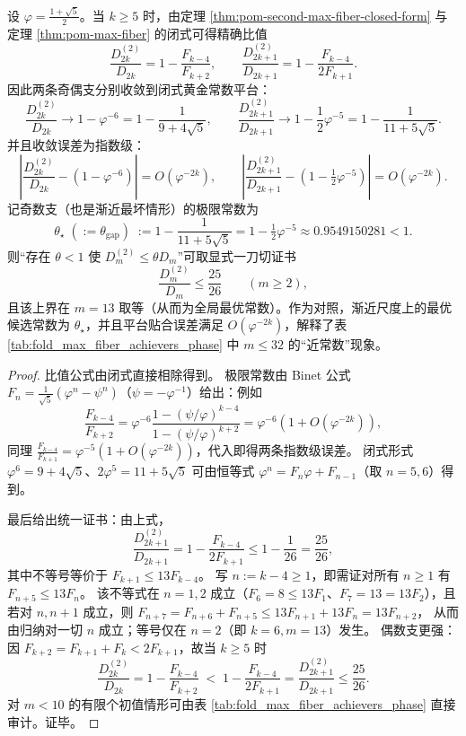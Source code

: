 \begin{corollary}\label{cor:pom-second-max-gap-constant}
设 \(\varphi=\frac{1+\sqrt5}{2}\)。当 \(k\ge 5\) 时，由定理 \ref{thm:pom-second-max-fiber-closed-form} 与定理 \ref{thm:pom-max-fiber} 的闭式可得精确比值
\[
\frac{D_{2k}^{(2)}}{D_{2k}}=1-\frac{F_{k-4}}{F_{k+2}},
\qquad
\frac{D_{2k+1}^{(2)}}{D_{2k+1}}=1-\frac{F_{k-4}}{2F_{k+1}}.
\]
因此两条奇偶支分别收敛到闭式黄金常数平台：
\[
\frac{D_{2k}^{(2)}}{D_{2k}}
\longrightarrow
1-\varphi^{-6}
=1-\frac{1}{9+4\sqrt5},
\qquad
\frac{D_{2k+1}^{(2)}}{D_{2k+1}}
\longrightarrow
1-\frac12\varphi^{-5}
=1-\frac{1}{11+5\sqrt5}.
\]
并且收敛误差为指数级：
\[
\left|\frac{D_{2k}^{(2)}}{D_{2k}}-\left(1-\varphi^{-6}\right)\right|=O(\varphi^{-2k}),
\qquad
\left|\frac{D_{2k+1}^{(2)}}{D_{2k+1}}-\left(1-\tfrac12\varphi^{-5}\right)\right|=O(\varphi^{-2k}).
\]
记奇数支（也是渐近最坏情形）的极限常数为
\[
\boxed{\;
\theta_\star\;(:=\theta_{\mathrm{gap}})\;:=1-\frac{1}{11+5\sqrt5}
=1-\tfrac12\varphi^{-5}
\approx 0.9549150281<1.
\;}
\]
则“存在 \(\theta<1\) 使 \(D_m^{(2)}\le \theta D_m\)”可取显式一刀切证书
\[
\boxed{\;
\frac{D_m^{(2)}}{D_m}\le \frac{25}{26}\qquad(m\ge 2),
\;}
\]
且该上界在 \(m=13\) 取等（从而为全局最优常数）。作为对照，渐近尺度上的最优候选常数为 \(\theta_\star\)，并且平台贴合误差满足 \(O(\varphi^{-2k})\)，解释了表 \ref{tab:fold_max_fiber_achievers_phase} 中 \(m\le 32\) 的“近常数”现象。
\end{corollary}
\begin{proof}
比值公式由闭式直接相除得到。
极限常数由 Binet 公式 \(F_n=\frac{1}{\sqrt5}(\varphi^n-\psi^n)\)（\(\psi=-\varphi^{-1}\)）给出：例如
\[
\frac{F_{k-4}}{F_{k+2}}
=\varphi^{-6}\frac{1-(\psi/\varphi)^{k-4}}{1-(\psi/\varphi)^{k+2}}
=\varphi^{-6}\left(1+O(\varphi^{-2k})\right),
\]
同理 \(\frac{F_{k-4}}{F_{k+1}}=\varphi^{-5}\left(1+O(\varphi^{-2k})\right)\)，代入即得两条指数级误差。
闭式形式 \(\varphi^6=9+4\sqrt5\)、\(2\varphi^5=11+5\sqrt5\) 可由恒等式 \(\varphi^n=F_n\varphi+F_{n-1}\)（取 \(n=5,6\)）得到。

最后给出统一证书：由上式，
\[
\frac{D_{2k+1}^{(2)}}{D_{2k+1}}=1-\frac{F_{k-4}}{2F_{k+1}}
\le 1-\frac{1}{26}=\frac{25}{26},
\]
其中不等号等价于 \(F_{k+1}\le 13F_{k-4}\)。
写 \(n:=k-4\ge 1\)，即需证对所有 \(n\ge 1\) 有 \(F_{n+5}\le 13F_n\)。
该不等式在 \(n=1,2\) 成立（\(F_6=8\le 13F_1\)、\(F_7=13=13F_2\)），且若对 \(n,n+1\) 成立，则
\(
F_{n+7}=F_{n+6}+F_{n+5}\le 13F_{n+1}+13F_n=13F_{n+2}
\)，
从而由归纳对一切 \(n\) 成立；等号仅在 \(n=2\)（即 \(k=6,m=13\)）发生。
偶数支更强：因 \(F_{k+2}=F_{k+1}+F_k<2F_{k+1}\)，故当 \(k\ge 5\) 时
\[
\frac{D_{2k}^{(2)}}{D_{2k}}
=1-\frac{F_{k-4}}{F_{k+2}}
\;<\;
1-\frac{F_{k-4}}{2F_{k+1}}
=\frac{D_{2k+1}^{(2)}}{D_{2k+1}}
\le \frac{25}{26}.
\]
对 \(m<10\) 的有限个初值情形可由表 \ref{tab:fold_max_fiber_achievers_phase} 直接审计。证毕。
\end{proof}

